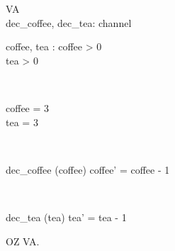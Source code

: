 \begin{figure}[H]
\centering
\begin{class}{VA}
\\dec\_coffee, dec\_tea: channel
\\
\begin{state}
coffee, tea : \integer
\ST
coffee > 0
\\
tea > 0
\end{state} 
\\
\begin{init}
coffee = 3
\\tea = 3
\end{init} 
\\
\begin{op}{dec\_coffee}
\Delta (coffee)
\ST
coffee' = coffee - 1
\end{op}
\\
\begin{op}{dec\_tea}
\Delta (tea)
\ST
tea' = tea - 1
\end{op}
\end{class}
\caption{OZ VA.}
\label{oz_VA}
\end{figure}